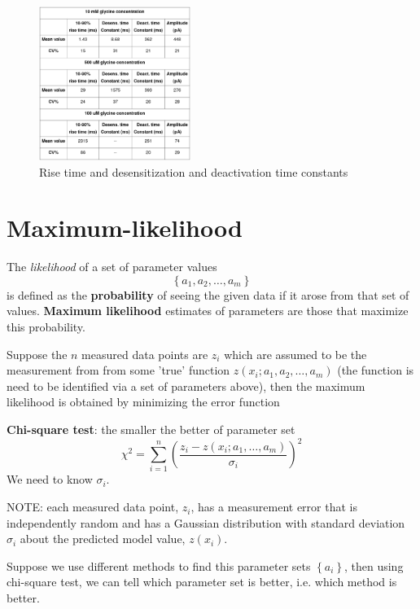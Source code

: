 \begin{figure}[hbt]
 \centerline{\includegraphics[height=5cm, angle=0]{./images/GlyR_estimated_param_2.eps}}
\caption{Rise time and desensitization and deactivation time constants}
\label{fig:GlyR_estimated_param_2}
\end{figure}

\section{Maximum-likelihood}
\label{sec:maximum-likelihood}
\label{sec:chi-square-test}

The {\it likelihood} of a set of parameter values
\begin{equation*}
\left\{ a_1, a_2, \ldots, a_m \right\}
\end{equation*}
is defined as the {\bf probability} of seeing the given data if it arose
from that set of values. {\bf Maximum likelihood} estimates of
parameters are those that maximize this probability.

Suppose the $n$ measured data points are $z_i$ which are assumed to be the
measurement from from some 'true' function $z(x_i; a_1, a_2, \ldots, a_m)$ (the
function is need to be identified via a set of parameters above), then
the maximum likelihood is obtained by minimizing the error function

{\bf Chi-square test}: the smaller the better of parameter set
\begin{equation}
\chi^2  = \sum_{i=1}^n \left( \frac{z_i - z(x_i; a_1, \ldots, a_m)}{\sigma_i}
\right)^2
\end{equation}
We need to know $\sigma_i$.

NOTE: each measured data point, $z_i$, has a measurement error that is
independently random and has a Gaussian distribution with standard deviation
$\sigma_i$ about the predicted model value, $z(x_i)$.

Suppose we use different methods to find this parameter sets
$\left\{a_i\right\}$, then using chi-square test, we can tell which parameter
set is better, i.e. which method is better.

